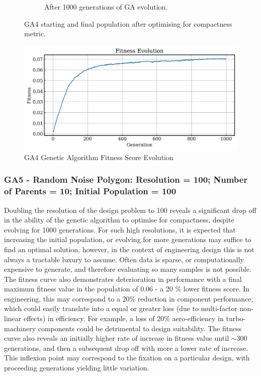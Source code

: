 \documentclass{article}
\begin{document}
\begin{figure}[H]
\begin{subfigure}[b]{0.45\textwidth}
        \caption{After 1000 generations of GA evolution.}
        \label{fig:GA4_final}
    \end{subfigure}
    \caption{GA4 starting and final population after optimising for compactness metric.}
    \label{fig:GA4_before_after_GA}
\end{figure}

\begin{figure}[H]
    \centering
    \includegraphics[width=0.75\linewidth]{figures/GAResults/GA4/1000gens_10pars_100initpop_5pcent_mut.png}
    \caption{GA4 Genetic Algorithm Fitness Score Evolution}
    \label{fig:GA4_fitness}
\end{figure}

\subsubsection*{GA5 - Random Noise Polygon: Resolution = 100; Number of Parents = 10; Initial Population = 100}
Doubling the resolution of the design problem to 100 reveals a significant drop off in the ability of the genetic algorithm to optimise for compactness, despite evolving for 1000 generations. For such high resolutions, it is expected that increasing the initial population, or evolving for more generations may suffice to find an optimal solution, however, in the context of engineering design this is not always a tractable luxury to assume. Often data is sparse, or computationally expensive to generate, and therefore evaluating so many samples is not possible.
The fitness curve also demonstrates deterioration in performance with a final maximum fitness value in the population of 0.06 - a 20 \% lower fitness score. In engineering, this may correspond to a 20\% reduction in component performance, which could easily translate into a equal or greater loss (due to multi-factor non-linear effects) in efficiency. For example, a loss of 20\% aero-efficiency in turbo-machinery components could be detrimental to design suitability. The fitness curve also reveals an initially higher rate of increase in fitness value until $\sim$300 generations, and then a subsequent drop off with more a lower rate of increase. This inflexion point may correspond to the fixation on a particular design, with proceeding generations yielding little variation.
\end{document}
